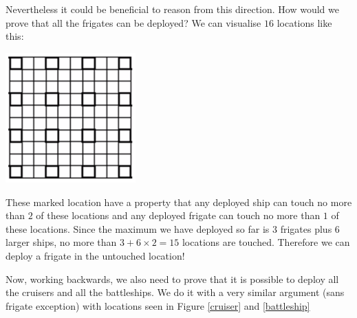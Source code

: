 \begin{problem}
Nevertheless it could be beneficial to reason from this direction. How would we prove that all the frigates can be deployed? We can visualise $16$ locations like this:

\begin{center}
\includegraphics[width=5cm]{SpotForFrigate.png}
\label{fig:SpotForFrigate}
\end{center}

These marked location have a property that any deployed ship can touch no more than $2$ of these locations and any deployed frigate can touch no more than $1$ of these locations. 
Since the maximum we have deployed so far is $3$ frigates plus $6$ larger ships, no more than $3+6\times 2= 15$ locations are touched. 
Therefore we can deploy a frigate in the untouched location!

Now, working backwards, we also need to prove that it is possible to deploy all the cruisers and all the battleships. We do it with a very similar argument (sans frigate exception) with 
locations seen in Figure \ref{cruiser} and \ref{battleship}




\end{problem}
